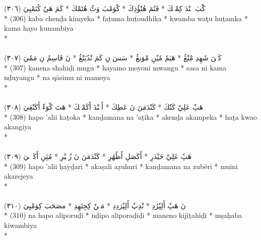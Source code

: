 \documentclass[a4paper, 12pt]{report}
\begin{document}
\begin{center}
\textarabic{(٣٠٦) \textcolor{mygreen}{كَْبَ چٖنْدَ كِمْيٖكَ  * فَتُمَ هُتٗؤُذِكَ  * كْوَمْبَ وَٹُ هُتَمْكَ  * كَمَ هَيٗ كُنَمْبِيَ }} \\* 
(306) kaba chenḏa kimyeka  * faṯuma huṯoudhika  * kwamba waţu huṯamka  * kama hayo kunambiya  \\* 
 \\ 
\\[8mm] 

\textarabic{(٣٠٧) \textcolor{mygreen}{كَنٖنَ شَهِدِ مْنْڠُ  * هَيَمٗ مٗيٗنِ مْوَنڠُ  * سَسَ نِ كَمَ نْدُيَنْڠُ  * نَ قَاسِمُ نِ مَمٗيَ }} \\* 
(307) kanena shahiḏi mngu  * hayamo moyoni mwangu  * sasa ni kama nḏuyangu  * na qāsimu ni mamoya  \\* 
 \\ 
\\[8mm] 

\textarabic{(٣٠٨) \textcolor{mygreen}{هَپٗ عَلِيْ كَتٗكَ  * كَنْدَمَنَ نَ عَطِكَ  * أَكٖنْدَ أَكَمْپٖكَ  * هَتَ كْوَءٗ أَكَنْڠِيَ }} \\* 
(308) hapo 'alii kaṯoka  * kanḏamana na 'aṭika  * akenḏa akampeka  * haṯa kwao akangiya  \\* 
 \\ 
\\[8mm] 

\textarabic{(٣٠٩) \textcolor{mygreen}{هَپٗ عَلِيْ حَيْدَرِ  * أَكَصَلِ أَظُهُرِ  * كَنْدَمَنَ نَ زُبٖيْرِ  * مُئِنِ أَكَرٖجٖيَ }} \\* 
(309) hapo 'alii ḥayḏari  * akaṣali aẓuhuri  * kanḏamana na zubēri  * muini akarejeya  \\* 
 \\ 
\\[8mm] 

\textarabic{(٣١٠) \textcolor{mygreen}{نَ هَپٗ أَلِپٗرُدِ  * نْدِپٗ أَلِپٗرَدِدِ  * مَنٖنٗ كِجِتَهِدِ  * مصَحَبَ كِوَمْبِيَ }} \\* 
(310) na hapo aliporuḏi  * nḏipo aliporaḏiḏi  * maneno kijiṯahiḏi  * mṣaḥaba kiwambiya  \\* 
 \\ 
\\[8mm] 


\end{center}
\end{document}
